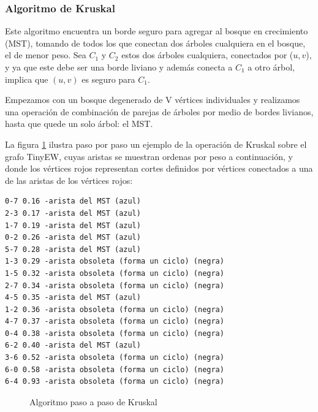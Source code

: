\documentclass[a4paper, 11pt]{report}
\newcommand{\DrawEJcGraph}[5]{

    \begin{scope}[#5]
    \foreach \pos/\nodo in {{(0,0)/4}, {(0,1.2)/5}, {(1,1)/7}, {(2,2.2)/1}, {(2,0.6)/0}, {(3.4,0.9)/2}, {(3.4,2.2)/3}, {(5,0)/6}}
        \node[vertex] (#3\nodo) at \pos {\nodo};
    \foreach \start/\end in {4/5, 5/7, 7/1,7/0,0/2,2/3,2/6,4/7,1/5,0/4,1/2,1/3,2/7,3/6,6/0,6/4}
        \path[edge,#5] (#3\start) -- (#3\end);

    \foreach \nodo in {#1}
        \node[selected vertex] at (#3\nodo) {\nodo};

    \begin{pgfonlayer}{background}%
        \foreach \start/\end in {#2}
            \path[rojod edge,#5] (#3\start) -- (#3\end);
    \end{pgfonlayer}
    \begin{pgfonlayer}{background}%
        \foreach \start/\end in {#3}
            \path[rojog edge,#5] (#3\start) -- (#3\end);
    \end{pgfonlayer}
    \begin{pgfonlayer}{background}%
        \foreach \start/\end in {#4}
            \path[azul edge,#5] (#3\start) -- (#3\end);
    \end{pgfonlayer}
    \end{scope}

}
\newcommand{\DrawArrow}[1]{
    \begin{scope}[scale=0.5,#1]
        \filldraw[arrow] (0,0) -- (2,0) -- +(270:0.5) -- (3,0.5) -- (2,1.5) -- +(270:0.5) -- (0,1) -- cycle;
    \end{scope}
}
\begin{document}
\subsubsection{Algoritmo de Kruskal}
Este algoritmo encuentra un borde seguro para agregar al bosque en crecimiento (MST), tomando de todos los que conectan dos árboles cualquiera en el bosque, el de menor peso. Sea $C_1$ y $C_2$ estos dos árboles cualquiera, conectados por ($u, v$), y ya que este debe ser una borde liviano y además conecta a $C_1$ a otro árbol, implica que $(u, v)$ es seguro para $C_1$. 

Empezamos con un bosque degenerado de V vértices individuales y realizamos una operación de combinación de parejas de árboles por medio de bordes livianos, hasta que quede un solo árbol: el MST.

La figura \ref{MST5} ilustra paso por paso un ejemplo de la operación de Kruskal sobre el grafo TinyEW, cuyas aristas se muestran ordenas por peso a continuación, y donde los vértices rojos representan cortes definidos por vértices conectados a una de las aristas de los vértices rojos: 

\begin{verbatim}
0-7 0.16 -arista del MST (azul)
2-3 0.17 -arista del MST (azul)
1-7 0.19 -arista del MST (azul)
0-2 0.26 -arista del MST (azul)
5-7 0.28 -arista del MST (azul)
1-3 0.29 -arista obsoleta (forma un ciclo) (negra) 
1-5 0.32 -arista obsoleta (forma un ciclo) (negra)
2-7 0.34 -arista obsoleta (forma un ciclo) (negra)
4-5 0.35 -arista del MST (azul)
1-2 0.36 -arista obsoleta (forma un ciclo) (negra)
4-7 0.37 -arista obsoleta (forma un ciclo) (negra)
0-4 0.38 -arista obsoleta (forma un ciclo) (negra)
6-2 0.40 -arista del MST (azul)
3-6 0.52 -arista obsoleta (forma un ciclo) (negra)
6-0 0.58 -arista obsoleta (forma un ciclo) (negra)
6-4 0.93 -arista obsoleta (forma un ciclo) (negra)
\end{verbatim}

\begin{figure}[!h]
    \caption{Algoritmo paso a paso de Kruskal}
    \label{MST5}
\end{figure}
\end{document}

